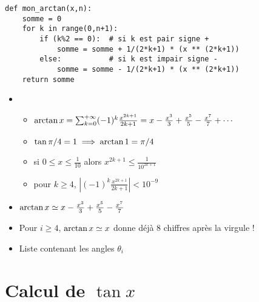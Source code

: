 \begin{frame}[fragile]

\begin{algo}[tangente.py (1)]
\begin{lstlisting}
def mon_arctan(x,n):
    somme = 0
    for k in range(0,n+1):
        if (k%2 == 0):  # si k est pair signe +
            somme = somme + 1/(2*k+1) * (x ** (2*k+1))  
        else:           # si k est impair signe -
            somme = somme - 1/(2*k+1) * (x ** (2*k+1))
    return somme
\end{lstlisting}  
\end{algo}

\pause

\begin{itemize}
  \item 
  \begin{itemize}
    \item $\mathop{\text{arctan}}\nolimits x= \sum_{k=0}^{+\infty} (-1)^k\frac{x^{2k+1}}{2k+1}= x - \frac{x^3}{3}+ \frac{x^5}{5}-\frac{x^7}{7}+\cdots$
\pause
    \item  $\tan \pi/4 = 1 \implies \mathop{\text{arctan}}\nolimits 1 = \pi/4$   
\pause
    \item si $0 \le x \le \frac 1{10}$ alors $x^{2k+1} \le \frac{1}{10^{2k+1}}$
\pause
    \item pour $k \ge 4$,  $\left| (-1)^k\frac{x^{2k+1}}{2k+1} \right| < 10^{-9}$
  \end{itemize}

\pause
  \item $\mathop{\text{arctan}}\nolimits x \simeq  x - \frac{x^3}{3}+ \frac{x^5}{5}-\frac{x^7}{7}$

\pause 
  \item Pour $i \ge 4$, $\mathop{\text{arctan}}\nolimits x \simeq x$ donne déjà $8$ chiffres après la virgule !

\pause  
  \item Liste  contenant les angles $\theta_i$
\end{itemize}

\end{frame}




\section{Calcul de $\tan x$}

\begin{frame}


\end{frame}

